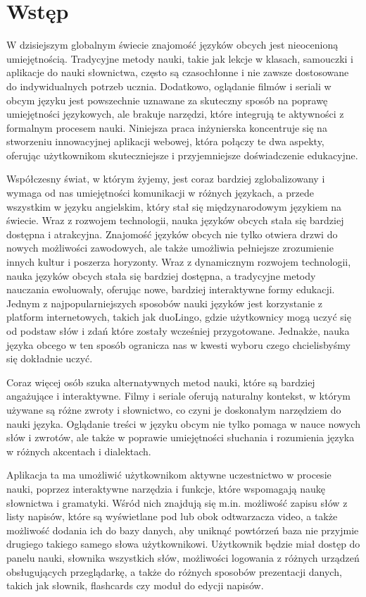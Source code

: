 \section{Wstęp}
W dzisiejszym globalnym świecie znajomość języków obcych jest nieocenioną umiejętnością. Tradycyjne metody nauki, takie jak lekcje w klasach, samouczki i aplikacje do nauki słownictwa, często są czasochłonne i nie zawsze dostosowane do indywidualnych potrzeb ucznia. Dodatkowo, oglądanie filmów i seriali w obcym języku jest powszechnie uznawane za skuteczny sposób na poprawę umiejętności językowych, ale brakuje narzędzi, które integrują te aktywności z formalnym procesem nauki. Niniejsza praca inżynierska koncentruje się na stworzeniu innowacyjnej aplikacji webowej, która połączy te dwa aspekty, oferując użytkownikom skuteczniejsze i przyjemniejsze doświadczenie edukacyjne.

Współczesny świat, w którym żyjemy, jest coraz bardziej zglobalizowany i wymaga od nas umiejętności komunikacji w różnych językach, a przede wszystkim w języku angielskim, który stał się międzynarodowym językiem na świecie. Wraz z rozwojem technologii, nauka języków obcych stała się bardziej dostępna i atrakcyjna. Znajomość języków obcych nie tylko otwiera drzwi do nowych możliwości zawodowych, ale także umożliwia pełniejsze zrozumienie innych kultur i poszerza horyzonty. Wraz z dynamicznym rozwojem technologii, nauka języków obcych stała się bardziej dostępna, a tradycyjne metody nauczania ewoluowały, oferując nowe, bardziej interaktywne formy edukacji. Jednym z najpopularniejszych sposobów nauki języków jest korzystanie z platform internetowych, takich jak duoLingo, gdzie użytkownicy mogą uczyć się od podstaw słów i zdań które zostały wcześniej przygotowane. Jednakże, nauka języka obcego w ten sposób ogranicza nas w kwesti wyboru czego chcielisbyśmy się dokładnie uczyć.

Coraz więcej osób szuka alternatywnych metod nauki, które są bardziej angażujące i interaktywne. Filmy i seriale oferują naturalny kontekst, w którym używane są różne zwroty i słownictwo, co czyni je doskonałym narzędziem do nauki języka. Oglądanie treści w języku obcym nie tylko pomaga w nauce nowych słów i zwrotów, ale także w poprawie umiejętności słuchania i rozumienia języka w różnych akcentach i dialektach.

Aplikacja ta ma umożliwić użytkownikom aktywne uczestnictwo w procesie nauki, poprzez interaktywne narzędzia i funkcje, które wspomagają naukę słownictwa i gramatyki. Wśród nich znajdują się m.in. możliwość zapisu słów z listy napisów, które są wyświetlane pod lub obok odtwarzacza video, a także możliwość dodania ich do bazy danych, aby uniknąć powtórzeń baza nie przyjmie drugiego takiego samego słowa użytkownikowi. Użytkownik będzie miał dostęp do panelu nauki, słownika wszystkich słów, możliwości logowania z różnych urządzeń obsługujących przeglądarkę, a także do różnych sposobów prezentacji danych, takich jak słownik, flashcards czy moduł do edycji napisów.

